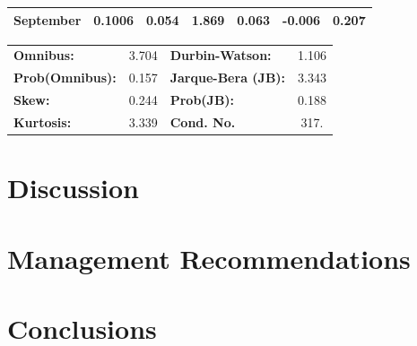 \documentclass[a4paper,11pt]{article}
\begin{document}
\begin{center}
\begin{tabular}{lcccccc}
\textbf{September}             &       0.1006  &        0.054     &     1.869  &         0.063        &       -0.006    &        0.207     \\
\bottomrule
\end{tabular}
\begin{tabular}{lclc}
\textbf{Omnibus:}       &  3.704 & \textbf{  Durbin-Watson:     } &    1.106  \\
\textbf{Prob(Omnibus):} &  0.157 & \textbf{  Jarque-Bera (JB):  } &    3.343  \\
\textbf{Skew:}          &  0.244 & \textbf{  Prob(JB):          } &    0.188  \\
\textbf{Kurtosis:}      &  3.339 & \textbf{  Cond. No.          } &     317.  \\
\bottomrule
\end{tabular}
\end{center}
\newpage

\section{Discussion}

\section{Management Recommendations}

\section{Conclusions}



\end{document}
